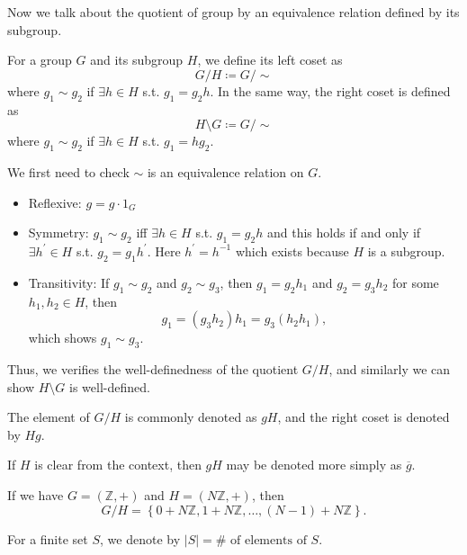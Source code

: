 Now we talk about the quotient of group by an equivalence relation defined by its subgroup. 

\begin{definition}
    For a group \(G\) and its subgroup \(H\), we define its left coset as 
    \[
        G / H \coloneqq  G / \sim 
    \] where \(g_1 \sim g_2\) if \(\exists h \in H\) s.t. \(g_1 = g_2 h\). In the same way, the right coset is defined as 
    \[
        H \setminus G \coloneqq G / \sim 
    \]  where \(g_1 \sim g_2\) if \(\exists h \in H\) s.t. \(g_1 = h g_2\).      
\end{definition}

We first need to check \(\sim \) is an equivalence relation on \(G\). 
\begin{itemize}
    \item Reflexive: \(g = g \cdot 1_G\) 
    \item Symmetry: \(g_1 \sim g_2\) iff \(\exists h \in H\) s.t. \(g_1 = g_2 h\) and this holds if and only if \(\exists h^{\prime} \in H\) s.t. \( g_2 = g_1 h^{\prime} \). Here \(h^{\prime} = h^{-1} \) which exists because \(H\) is a subgroup. 
    \item Transitivity: If \(g_1 \sim g_2\) and \(g_2 \sim g_3\), then \(g_1 = g_2 h_1 \) and \(g_2 = g_3 h_2\) for some \(h_1, h_2 \in H\), then 
    \[
        g_1 = (g_3 h_2)h_1 = g_3 (h_2 h_1),
    \]  which shows \(g_1 \sim g_3\).         
\end{itemize}  
Thus, we verifies the well-definedness of the quotient \(G / H\), and similarly we can show \(H \setminus G\) is well-defined. 

\begin{notation}
    The element of \(G / H \) is commonly denoted as \(gH\), and the right coset is denoted by \(Hg\).    
\end{notation}

\begin{note}
    If \(H\) is clear from the context, then \(gH\) may be denoted more simply as \(\overline{g} \). 
\end{note}  

\begin{eg}
    If we have \(G = (\mathbb{Z} , +)\) and \(H = (N \mathbb{Z} , +)\), then 
    \[
        G / H = \left\{ 0 + N \mathbb{Z} , 1 + N \mathbb{Z} , \dots , (N - 1) + N \mathbb{Z}  \right\}. 
    \]
\end{eg}

\begin{remark}
    For a finite set \(S\), we denote by \(\vert S \vert = \# \text{ of elements of } S\).  
\end{remark}

